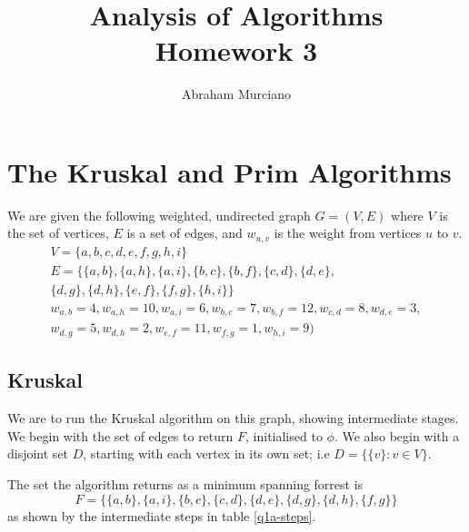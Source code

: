\documentclass{article}
\title{Analysis of Algorithms \\
\medskip
\large Homework 3}
\author{Abraham Murciano}
\begin{document}
\maketitle

\section{The Kruskal and Prim Algorithms}

We are given the following weighted, undirected graph \(G = (V, E)\) where \(V\) is the set of vertices, \(E\) is a set of edges, and \(w_{u,v}\) is the weight from vertices \(u\) to \(v\).
\begin{gather*}
	V = \{a, b, c, d, e, f, g, h, i\} \\
	E = \{\{a, b\}, \{a, h\}, \{a, i\}, \{b, c\}, \{b, f\}, \{c, d\}, \{d, e\},\\ \{d, g\}, \{d, h\}, \{e, f\}, \{f, g\}, \{h, i\}\} \\
	w_{a, b} = 4, w_{a, h} = 10, w_{a, i} = 6, w_{b, c} = 7, w_{b, f} = 12, w_{c, d} = 8, w_{d, e} = 3, \\ w_{d, g} = 5, w_{d, h} = 2, w_{e, f} = 11, w_{f, g} = 1, w_{h, i} = 9)
\end{gather*}

\subsection{Kruskal}

We are to run the Kruskal algorithm on this graph, showing intermediate stages. We begin with the set of edges to return \(F\), initialised to \(\phi\). We also begin with a disjoint set \(D\), starting with each vertex in its own set; i.e \(D = \{\{v\} : v \in V\}\).

The set the algorithm returns as a minimum spanning forrest is
\begin{equation*}
	F = \{\{a, b\}, \{a, i\}, \{b, c\}, \{c, d\}, \{d, e\}, \{d, g\}, \{d, h\}, \{f, g\}\}
\end{equation*}
as shown by the intermediate steps in table \ref{q1a-steps}.
\end{document}
